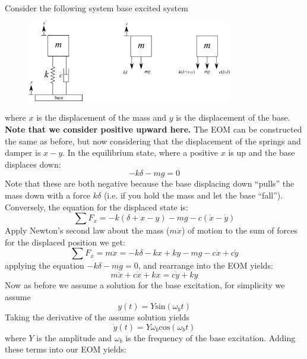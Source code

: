 \documentclass[12pt,letter]{article}
\numberwithin{ex}{section} %
\numberwithin{re}{section} %
\begin{document}
Consider the following system base excited system
\begin{figure}[H]
	\centering
	\includegraphics[width=0.8\textwidth]{../Figures/base_excited_1_DOF_model_and_FBDs.png}
\end{figure}
where $x$ is the displacement of the mass and $y$ is the displacement of the base. \textbf{Note that we consider positive upward here.} The EOM can be constructed the same as before, but now considering that the displacement of the springs and damper is $x-y$.  In the equilibrium state, where a positive $x$ is up and the base displaces down:
\begin{equation}
-k\delta -mg =0
\end{equation}	
Note that these are both negative because the base displacing down ``pulls'' the mass down with a force $k\delta$ (i.e. if you hold the mass and let the base ``fall''). Conversely, the equation for the displaced state is:
\begin{equation}
\sum F_x = -k(\delta + x - y) -mg -c(\dot{x} -\dot{y})
\end{equation}	
Apply Newton's second law about the mass ($m\ddot{x}$) of motion to the sum of forces for the displaced position we get:
\begin{equation}
\sum F_x = m\ddot{x} = -k\delta -kx + ky -mg -c\dot{x} +c\dot{y}
\end{equation}	
applying the equation $-k\delta -mg =0$, and rearrange into the EOM yields:	
\begin{equation}
m\ddot{x} + c\dot{x} + kx = c\dot{y} + ky 
\end{equation}
Now as before we assume a solution for the base excitation, for simplicity we assume
\begin{equation}
y(t) = Y\text{sin}(\omega_b t)
\end{equation}
Taking the derivative of the assume solution yields
\begin{equation}
\dot{y}(t) = Y \omega_b \text{cos}(\omega_b t)
\end{equation}
where $Y$ is the amplitude and $\omega_b$ is the frequency of the base excitation. Adding these terms into our EOM yields:
\end{document}
